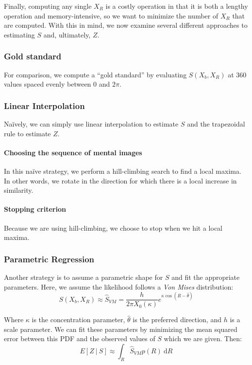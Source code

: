\documentclass{article} %
\begin{document}
Finally, computing any single $X_R$ is a costly operation in that it
is both a lengthy operation and memory-intensive, so we want to
minimize the number of $X_R$ that are computed. With this in mind, we
now examine several different approaches to estimating $S$ and,
ultimately, $Z$.

\subsubsection{Gold standard}

For comparison, we compute a ``gold standard'' by evaluating $S(X_b,
X_R)$ at 360 values spaced evenly between $0$ and $2\pi$.

\subsubsection{Linear Interpolation}

Na\"ively, we can simply use linear interpolation to estimate $S$ and
the trapezoidal rule to estimate $Z$.

\paragraph{Choosing the sequence of mental images}

In this naïve strategy, we perform a hill-climbing search to find a
local maxima. In other words, we rotate in the direction for which
there is a local increase in similarity.

\paragraph{Stopping criterion}

Because we are using hill-climbing, we choose to stop when we hit a
local maxima.

\subsubsection{Parametric Regression}

Another strategy is to assume a parametric shape for $S$ and fit the
appropriate parameters. Here, we assume the likelihood follows a
\emph{Von Mises} distribution:
\begin{equation}
  S(X_b, X_R) \approx \hat{S}_{VM}=\frac{h}{2\pi X_0(\kappa)}e^{\kappa\cos(R-\hat{\theta})}
\end{equation}

Where $\kappa$ is the concentration parameter, $\hat{\theta}$ is the
preferred direction, and $h$ is a scale parameter. We can fit these
parameters by minimizing the mean squared error between this PDF and
the observed values of $S$ which we are given. Then:
\begin{equation}
E[Z\ \vert \ S]\approx \int_R \hat{S}_{VM}p(R)\ \mathrm{d}R
\end{equation}
\end{document}
